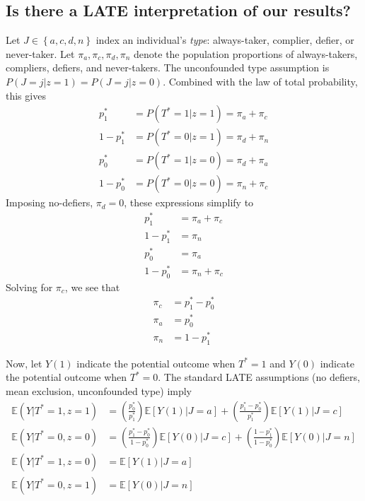 \documentclass[12pt]{article}
\begin{document}
\subsection{Is there a LATE interpretation of our results?}
Let $J \in \left\{ a, c, d, n \right\}$ index an individual's \emph{type}: always-taker, complier, defier, or never-taker.
Let $\pi_a, \pi_c, \pi_d, \pi_n$ denote the population proportions of always-takers, compliers, defiers, and never-takers.
The unconfounded type assumption is $P(J=j|z=1) = P(J=j|z=0)$.
Combined with the law of total probability, this gives
\begin{align*}
  p^*_1 &= P(T^*=1|z=1) = \pi_a + \pi_c \\
  1 - p^*_1 &= P(T^*=0|z=1) = \pi_d + \pi_n \\
  p^*_0 &= P(T^*=1|z=0) = \pi_d + \pi_a \\
  1-p^*_0 &= P(T^*=0|z=0) = \pi_n + \pi_c 
\end{align*}
Imposing no-defiers, $\pi_d = 0$, these expressions simplify to
\begin{align*}
  p^*_1 &=  \pi_a + \pi_c \\
  1 - p^*_1 &=  \pi_n \\
  p^*_0 &=  \pi_a \\
  1-p^*_0 &=  \pi_n + \pi_c 
\end{align*}
Solving for $\pi_c$, we see that
\begin{align*}
  \pi_c &= p_1^* - p_0^*\\
  \pi_a &= p_0^*\\
  \pi_n &= 1 - p_1^*
\end{align*}

Now, let $Y(1)$ indicate the potential outcome when $T^*=1$ and $Y(0)$ indicate the potential outcome when $T^*=0$.
The standard LATE assumptions (no defiers, mean exclusion, unconfounded type) imply
\begin{align*}
  \mathbb{E}\left( Y| T^* = 1, z = 1 \right) &= \left( \frac{p_0^*}{p_1^*} \right) \mathbb{E}\left[ Y(1)|J=a \right] + \left( \frac{p_1^* - p_0^*}{p_1^*} \right)\mathbb{E}\left[ Y(1)|J=c \right] \\
  \mathbb{E}\left( Y| T^* = 0, z = 0 \right) &= \left( \frac{p_1^* - p_0^*}{1 - p_0^*} \right)\mathbb{E}\left[ Y(0)|J=c \right] + \left( \frac{1 - p_1^*}{1 - p_0^*} \right)\mathbb{E}\left[ Y(0)|J=n \right]\\
  \mathbb{E}\left( Y| T^* = 1, z = 0 \right) &= \mathbb{E}\left[ Y(1)|J=a \right]\\
  \mathbb{E}\left( Y| T^* = 0, z = 1 \right) &= \mathbb{E}\left[ Y(0)|J=n \right]
\end{align*}
\end{document}

